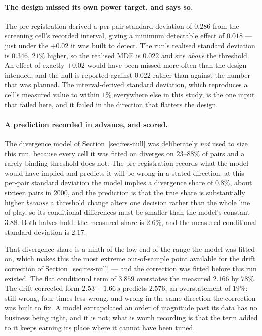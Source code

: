 \documentclass[11pt,a4paper]{article}
\begin{document}
\paragraph{The design missed its own power target, and says so.} The
pre-registration derived a per-pair standard deviation of $0.286$ from the
screening cell's recorded interval, giving a minimum detectable effect of
$0.018$ --- just under the $+0.02$ it was built to detect. The run's realised
standard deviation is $0.346$, $21\%$ higher, so the realised MDE is $0.022$ and
sits \emph{above} the threshold. An effect of exactly $+0.02$ would have been
missed more often than the design intended, and the null is reported against
$0.022$ rather than against the number that was planned. The interval-derived
standard deviation, which reproduces a cell's measured value to within $1\%$
everywhere else in this study, is the one input that failed here, and it failed
in the direction that flatters the design.

\paragraph{A prediction recorded in advance, and scored.} The divergence model
of Section~\ref{sec:res-null} was deliberately \emph{not} used to size this run,
because every cell it was fitted on diverges on $23$--$88\%$ of pairs and a
rarely-binding threshold does not. The pre-registration records what the model
would have implied and predicts it will be wrong in a stated direction: at this
per-pair standard deviation the model implies a divergence share of $0.8\%$,
about sixteen pairs in $2000$, and the prediction is that the true share is
substantially higher \emph{because} a threshold change alters one decision
rather than the whole line of play, so its conditional differences must be
smaller than the model's constant $3.88$. Both halves hold: the measured share
is $2.6\%$, and the measured conditional standard deviation is $2.17$.

That divergence share is a ninth of the low end of the range the model was
fitted on, which makes this the most extreme out-of-sample point available for
the drift correction of Section~\ref{sec:res-null} --- and the correction was
fitted before this run existed. The flat conditional term of $3.859$ overstates
the measured $2.166$ by $78\%$. The drift-corrected form
$2.53 + 1.66\,s$ predicts $2.576$, an overstatement of $19\%$: still wrong, four
times less wrong, and wrong in the same direction the correction was built to
fix. A model extrapolated an order of magnitude past its data has no business
being right, and it is not; what is worth recording is that the term added to it
keeps earning its place where it cannot have been tuned.
\end{document}

